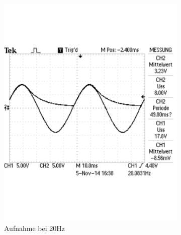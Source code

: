 \documentclass[12pt,a4paper]{article}
\begin{document}
\begin{figure}[H]
        \centering
        \begin{subfigure}[b]{0.48\textwidth}
                \includegraphics[width=\textwidth , scale = 0.4]{2_2_1F_1.pdf}
                \caption[Aufnahme bei 20Hz]{Aufnahme bei 20Hz}
 				 \label{fig:2_2_1F_1}
        \end{subfigure}%
        \hfill
        \begin{subfigure}[b]{0.48\textwidth}

\end{subfigure}
\end{figure}
\end{document}
